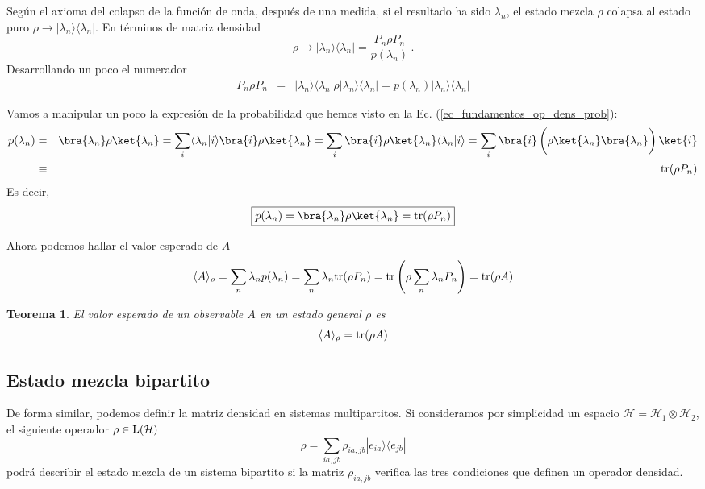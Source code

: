 \documentclass[a4paper,11pt]{book} %
\newtheorem{teorema_contador}{Teorema}
\newcommand{\Teorema}[1]{
		\begin{mybox_gray2}{}
			\begin{teorema_contador}
				 #1 
			\end{teorema_contador} 
		\end{mybox_gray2}
	}
\numberwithin{equation}{chapter}
\newcommand{\braket}[2]{\langle #1|#2\rangle}
\newcommand{\ketbra}[2]{| #1\rangle \! \langle #2|}
\begin{document}
Según el axioma del colapso de la función de onda, después de una medida, si el resultado ha sido $\lambda_n$, el estado mezcla $\rho$ colapsa al estado puro $\rho\to \ketbra{\lambda_n}{\lambda_n}$. En términos de matriz densidad
	\begin{equation}
	\rho \to \ketbra{\lambda_n}{\lambda_n} = \frac{P_n\rho P_n}{p(\lambda_n)} \, .
	\end{equation}
Desarrollando un poco el numerador
\begin{eqnarray}
P_n \rho P_n &=& \ketbra{\lambda_n}{\lambda_n} \rho \ketbra{\lambda_n}{\lambda_n}  = p(\lambda_n) \ketbra{\lambda_n}{\lambda_n}
\end{eqnarray}

Vamos a manipular un poco la expresión de la probabilidad que hemos visto en la Ec. (\ref{ec_fundamentos_op_dens_prob}):
\begin{eqnarray}
p(\lambda_n) &=& \bra{\lambda_n}\rho\ket{\lambda_n} = \sum_i  \braket{\lambda_n}{i}\bra{i}\rho\ket{\lambda_n} =
\sum_i \bra{i}\rho\ket{\lambda_n}\braket{\lambda_n}{i} = \sum_i \bra{i}\left( \rho\ket{\lambda_n}\bra{\lambda_n}\rule{0mm}{5mm}\right)\ket{i} \nonumber\\
&\equiv& {\rm tr}(\rho P_n )
\end{eqnarray}
Es decir,
	\begin{equation}
	\boxed{p(\lambda_n) = \bra{\lambda_n}\rho\ket{\lambda_n} = {\rm tr} (\rho P_n)}
	\end{equation}

Ahora podemos hallar el valor esperado de $A$
	\begin{equation}
	\langle A\rangle_\rho = \sum_n \lambda_n p(\lambda_n) = \sum_n \lambda_n {\rm tr}(\rho P_n ) 
     = {\rm tr} \left( \rho \sum_n \lambda_n P_n \right) = {\rm tr }(\rho A)
	\end{equation}

	\Teorema{
	El valor esperado de un observable $A$ en un estado general $\rho$ es 
		\begin{equation}
		\langle A\rangle_\rho = {\rm tr}(\rho A) 
		\end{equation}
	}

		\subsection{Estado mezcla bipartito}

De forma similar, podemos definir la matriz densidad en sistemas multipartitos. Si consideramos por simplicidad un espacio $\mathcal{H}=\mathcal{H}_1\otimes\mathcal{H}_2$, el siguiente operador $\rho \in {\rm L}(\mathcal{H})$ 
	\begin{equation}
	\rho=\sum_{ia,jb}\rho_{ia,jb}\ketbra{e_{ia}}{e_{jb}}
	\end{equation}
podrá describir el estado mezcla de un sistema bipartito si la matriz $\rho_{ia,jb}$ verifica las tres condiciones que definen un operador densidad.  
\end{document}
